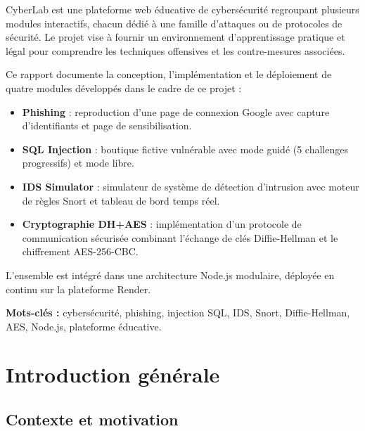 \documentclass[12pt,a4paper]{report}
\begin{document}
CyberLab est une plateforme web éducative de cybersécurité regroupant
plusieurs modules interactifs, chacun dédié à une famille d'attaques ou
de protocoles de sécurité. Le projet vise à fournir un environnement
d'apprentissage pratique et légal pour comprendre les techniques offensives
et les contre-mesures associées.

Ce rapport documente la conception, l'implémentation et le déploiement de
quatre modules développés dans le cadre de ce projet :
\begin{itemize}
  \item \textbf{Phishing} : reproduction d'une page de connexion Google
        avec capture d'identifiants et page de sensibilisation.
  \item \textbf{SQL Injection} : boutique fictive vulnérable avec mode guidé
        (5 challenges progressifs) et mode libre.
  \item \textbf{IDS Simulator} : simulateur de système de détection d'intrusion
        avec moteur de règles Snort et tableau de bord temps réel.
  \item \textbf{Cryptographie DH+AES} : implémentation d'un protocole de
        communication sécurisée combinant l'échange de clés Diffie-Hellman
        et le chiffrement AES-256-CBC.
\end{itemize}

L'ensemble est intégré dans une architecture Node.js modulaire, déployée
en continu sur la plateforme Render.

\vspace{1cm}
\textbf{Mots-clés :} cybersécurité, phishing, injection SQL, IDS, Snort,
Diffie-Hellman, AES, Node.js, plateforme éducative.

\tableofcontents
\clearpage

\listoffigures
{}
\clearpage

\chapter{Introduction générale}

\section{Contexte et motivation}
\end{document}
